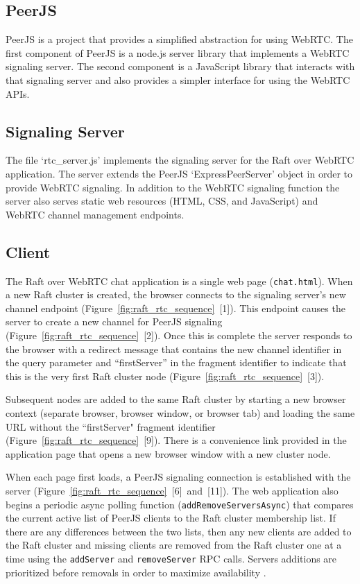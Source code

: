 \documentclass[conference,compsoc]{./IEEEtran/IEEEtran}
\begin{document}
\subsection{PeerJS}

PeerJS is a project that provides a simplified abstraction for using WebRTC. The first component of PeerJS is a node.js server library that implements a WebRTC signaling server. The second component is a JavaScript library that interacts with that signaling server and also provides a simpler interface for using the WebRTC APIs.

\subsection{Signaling Server}

The file `rtc\_server.js' implements the signaling server for the Raft over WebRTC application. The server extends the PeerJS `ExpressPeerServer' object in order to provide WebRTC signaling. In addition to the WebRTC signaling function the server also serves static web resources (HTML, CSS, and JavaScript) and WebRTC channel management endpoints.

\subsection{Client}

The Raft over WebRTC chat application is a single web page (\texttt{chat.html}). When a new Raft cluster is created, the browser connects to the signaling server's new channel endpoint (Figure~\ref{fig:raft_rtc_sequence}~[1]). This endpoint causes the server to create a new channel for PeerJS signaling (Figure~\ref{fig:raft_rtc_sequence}~[2]). Once this is complete the server responds to the browser with a redirect message that contains the new channel identifier in the query parameter and ``firstServer” in the fragment identifier to indicate that this is the very first Raft cluster node (Figure~\ref{fig:raft_rtc_sequence}~[3]).

Subsequent nodes are added to the same Raft cluster by starting a new browser context (separate browser, browser window, or browser tab) and loading the same URL without the ``firstServer" fragment identifier (Figure~\ref{fig:raft_rtc_sequence}~[9]). There is a convenience link provided in the application page that opens a new browser window with a new cluster node.

When each page first loads, a PeerJS signaling connection is established with the server (Figure~\ref{fig:raft_rtc_sequence}~[6]~and~[11]). The web application also begins a periodic async polling function (\texttt{addRemoveServersAsync}) that compares the current active list of PeerJS clients to the Raft cluster membership list. If there are any differences between the two lists, then any new clients are added to the Raft cluster and missing clients are removed from the Raft cluster one at a time using the \texttt{addServer} and \texttt{removeServer} RPC calls. Servers additions are prioritized before removals in order to maximize availability \cite[Section~4.4]{raft_thesis:ongaro14}.
\end{document}
